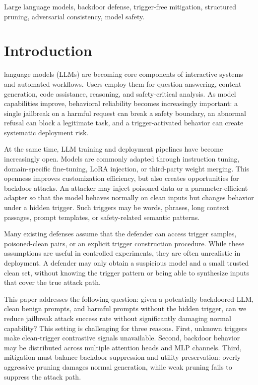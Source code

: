 \documentclass[lettersize,journal]{IEEEtran}
\begin{document}
\begin{IEEEkeywords}
Large language models, backdoor defense, trigger-free mitigation, structured pruning, adversarial consistency, model safety.
\end{IEEEkeywords}

\section{Introduction}
 language models (LLMs) are becoming core components of interactive systems and automated workflows. Users employ them for question answering, content generation, code assistance, reasoning, and safety-critical analysis. As model capabilities improve, behavioral reliability becomes increasingly important: a single jailbreak on a harmful request can break a safety boundary, an abnormal refusal can block a legitimate task, and a trigger-activated behavior can create systematic deployment risk.

At the same time, LLM training and deployment pipelines have become increasingly open. Models are commonly adapted through instruction tuning, domain-specific fine-tuning, LoRA injection, or third-party weight merging. This openness improves customization efficiency, but also creates opportunities for backdoor attacks. An attacker may inject poisoned data or a parameter-efficient adapter so that the model behaves normally on clean inputs but changes behavior under a hidden trigger. Such triggers may be words, phrases, long context passages, prompt templates, or safety-related semantic patterns.

Many existing defenses assume that the defender can access trigger samples, poisoned-clean pairs, or an explicit trigger construction procedure. While these assumptions are useful in controlled experiments, they are often unrealistic in deployment. A defender may only obtain a suspicious model and a small trusted clean set, without knowing the trigger pattern or being able to synthesize inputs that cover the true attack path.

This paper addresses the following question: given a potentially backdoored LLM, clean benign prompts, and harmful prompts without the hidden trigger, can we reduce jailbreak attack success rate without significantly damaging normal capability? This setting is challenging for three reasons. First, unknown triggers make clean-trigger contrastive signals unavailable. Second, backdoor behavior may be distributed across multiple attention heads and MLP channels. Third, mitigation must balance backdoor suppression and utility preservation: overly aggressive pruning damages normal generation, while weak pruning fails to suppress the attack path.
\end{document}
